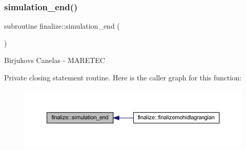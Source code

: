 \subsubsection{\texorpdfstring{simulation\+\_\+end()}{simulation\_end()}}
{\footnotesize\ttfamily subroutine finalize\+::simulation\+\_\+end (\begin{DoxyParamCaption}{ }\end{DoxyParamCaption})\hspace{0.3cm}{\ttfamily [private]}}



Birjukovs Canelas -\/ M\+A\+R\+E\+T\+EC 

Private closing statement routine. Here is the caller graph for this function\+:
\nopagebreak
\begin{figure}[H]
\begin{center}
\leavevmode
\includegraphics[width=350pt]{namespacefinalize_a57fbc96712f416103b529ff969479250_icgraph}
\end{center}
\end{figure}
